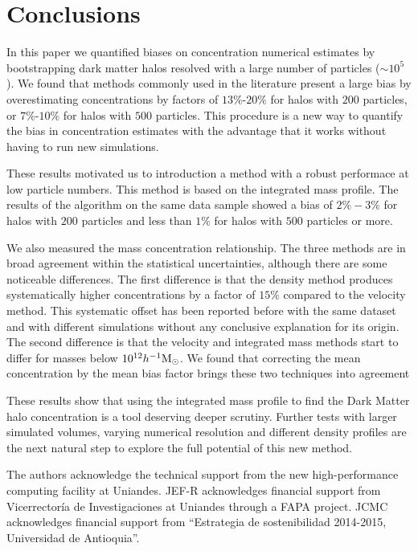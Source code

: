 \documentclass{emulateapj}
\newcommand{\hMsun}{{\ifmmode{h^{-1}{\rm {M_{\odot}}}}\else{$h^{-1}{\rm{M_{\odot}}}$}\fi}}
\begin{document}
\section{Conclusions}
\label{sec:conclusions}

In this paper we quantified biases on concentration numerical estimates by
bootstrapping dark matter halos resolved with a  large number of
particles ($\sim 10^5$).
We found that methods commonly used in the literature present a large
bias by overestimating concentrations by factors of $13\%$-$20\%$ for
halos with $200$ particles, or $7\%$-$10\%$ for halos with $500$
particles.  
This procedure is a new way to quantify the bias in concentration
estimates with the advantage that it works without having to run new
simulations. 

These results motivated us to introduction a method with a robust
performace at low particle numbers.
This method is based on the integrated mass profile. 
The results of the algorithm on the same data sample showed a bias  of
$2\%-3\%$ for halos with $200$ particles and less than $1\%$ for halos
with $500$ particles or more.  


We also measured the mass concentration relationship. 
The three methods are in broad agreement within the statistical
uncertainties, although there are some noticeable differences.
The first difference is that the density method produces
systematically higher concentrations by a factor of $15\%$ compared to
the velocity method.
This systematic offset has been reported before with the same dataset 
\citep{Prada2012} and with different simulations \citep{Klypin2016}
without any conclusive explanation for its origin. 
The second difference is that the velocity and integrated mass methods
start to differ for masses below $10^{12}\hMsun$.  
We found that correcting the mean concentration by the mean bias
factor brings these two techniques into agreement

These results show that using the integrated mass profile to find the
Dark Matter halo concentration is a tool deserving deeper scrutiny.   
Further tests with larger simulated volumes, varying numerical
resolution and different density profiles are the next natural step to
explore the full potential of this new method. 


\vspace{0.1cm}

 The authors acknowledge the technical support from the new
 high-performance computing facility at Uniandes. JEF-R acknowledges
 financial support from Vicerrector\'ia de Investigaciones at Uniandes
 through a FAPA project. JCMC acknowledges financial support from
 ``Estrategia de  sostenibilidad 2014-2015, Universidad de
 Antioquia''.    
\end{document}
